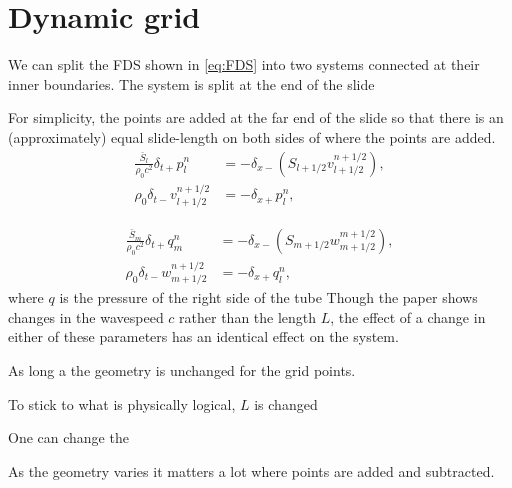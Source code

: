 \section{Dynamic grid}\label{sec:dynamicGrid}
We can split the FDS shown in \eqref{eq:FDS} into two systems connected at their inner boundaries. The system is split at the end of the slide

For simplicity, the points are added at the far end of the slide so that there is an (approximately) equal slide-length on both sides of where the points are added. 
\begin{subequations}
    \begin{align}
        \frac{\bar S_l}{\rho_0 c^2}\delta_{t+}p_l^n &= -\delta_{x-}(S_{l+1/2}v_{l+1/2}^{n+1/2}),\label{eq:discPressure}\\
        \rho_0 \delta_{t-}v_{l+1/2}^{n+1/2}&=-\delta_{x+}p_l^n,\label{eq:discVelocity}
    \end{align}
\end{subequations}

\begin{subequations}
    \begin{align}
        \frac{\bar S_m}{\rho_0 c^2}\delta_{t+}q_m^n &= -\delta_{x-}(S_{m+1/2}w_{m+1/2}^{m+1/2}),\label{eq:discPressure}\\
        \rho_0 \delta_{t-}w_{m+1/2}^{n+1/2}&=-\delta_{x+}q_l^n,\label{eq:discVelocity}
    \end{align}
\end{subequations}
where $q$ is the pressure of the right side of the tube
Though the paper shows changes in the wavespeed $c$ rather than the length $L$, the effect of a change in either of these parameters has an identical effect on the system. 

As long a the geometry is unchanged for the grid points. 

To stick to what is physically logical, $L$ is changed




One can change the 


As the geometry varies it matters a lot where points are added and subtracted. 

